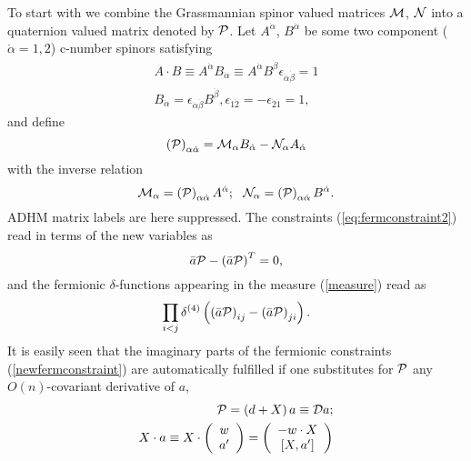 \documentclass[a4paper,12pt]{article}
\begin{document}
To start with we combine the Grassmannian spinor valued matrices 
${\cal M}$, ${\cal N}$ into a quaternion valued matrix denoted by 
${\cal P}$. Let $A^{\dot{\alpha}}$, $B^{\dot{\alpha}}$ be some 
two component ($\dot{\alpha}=1,2$) c-number spinors satisfying 
\begin{eqnarray}
A\cdot B\equiv A^{\dot{\alpha}} B_{\dot{\alpha}} \equiv 
A^{\dot{\alpha}} B^{\dot{\beta}} \epsilon_{\dot{\alpha}\dot{\beta}} 
=1 \nonumber \\
B_{\dot{\alpha}}=\epsilon_{\dot{\alpha}\dot{\beta}}
B^{\dot{\beta}}, \epsilon_{\dot{1}\dot{2}}=-\epsilon_{\dot{2}\dot{1}} 
=1, \nonumber
\end{eqnarray}
and define 
\begin{equation}
\left({\cal P}\right)_{\alpha \dot{\alpha}}={\cal M}_{\alpha} 
B_{\dot{\alpha}}-{\cal N}_{\alpha}A_{\dot{\alpha}}
\end{equation}
with the inverse relation
\begin{equation}
{\cal M}_{\alpha}=\left({\cal P}\right)_{\alpha \dot{\alpha}} 
A^{\dot{\alpha}}; \, \, \, \,
{\cal N}_{\alpha}=\left({\cal P}\right)_{\alpha \dot{\alpha}} 
B^{\dot{\alpha}}.
\end{equation}   
ADHM matrix labels are here suppressed. The constraints 
(\ref{eq:fermconstraint2}) read in terms of the new variables as 
\begin{equation}
\bar{a}{\cal P}-\left(\bar{a}{\cal P}\right)^T=0,
\label{newfermconstraint}
\end{equation}
and the fermionic $\delta$-functions appearing in the measure 
(\ref{measure}) read as 
\begin{equation}
\prod_{i<j}\delta^{(4)}\left(\left(\bar{a}{\cal P}\right)_{ij}-
\left(\bar{a}{\cal P}\right)_{ji}\right). 
\label{fermdelta}
\end{equation}
It is easily seen that the imaginary parts of the 
fermionic constraints (\ref{newfermconstraint})
are automatically fulfilled if one substitutes for ${\cal P}$ 
any $O(n)$-covariant derivative of $a$, 
\begin{eqnarray}
{\cal P}=\left(d+X\right)a\equiv{\cal D}a; \nonumber \\
X\cdot a\equiv X\cdot 
\left( 
\begin{array}{c}
w \\
a'
\end{array}
\right)=\left(
\begin{array}{c}
-w\cdot X  \\
\left[ X,a' \right]
\end{array}
\right)       
\label{covariantd}
\end{eqnarray}
\end{document}
